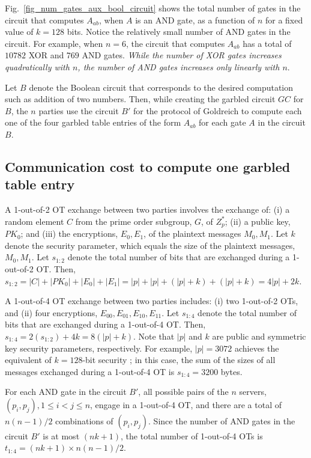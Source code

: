 \documentclass[10pt,journal,cspaper,compsoc]{IEEEtran}
\begin{document}
Fig.~\ref{fig_num_gates_aux_bool_circuit} shows the total number of gates in the circuit that computes $A_{ab}$, when $A$ is an AND gate, as a function of $n$ for a fixed value of $k=128$ bits. Notice the relatively small number of AND gates in the circuit. For example, when $n=6$, the circuit that computes $A_{ab}$ has a total of $10782$ XOR and $769$ AND gates. {\em While the number of XOR gates increases quadratically with $n$, the number of AND gates increases only linearly with $n$}.


Let $B$ denote the Boolean circuit that corresponds to the desired computation such as addition of two numbers. Then, while creating the garbled circuit $GC$ for $B$, the $n$ parties use the circuit $B'$ for the protocol of Goldreich to compute each one of the four garbled table entries of the form $A_{ab}$ for each gate $A$ in the circuit $B$.







\subsection{Communication cost to compute one garbled table entry}
\label{sec_communication_cost_to_compute_one_entry}

A 1-out-of-2 OT exchange between two parties involves the exchange of: (i) a random element $C$ from the prime order subgroup, $G$, of $Z_p^*$; (ii) a public key, $PK_0$; and (iii) the encryptions, $E_0,E_1$, of the plaintext messages $M_0,M_1$. Let $k$ denote the security parameter, which equals the size of the plaintext messages, $M_0,M_1$. Let $s_{1:2}$ denote the total number of bits that are exchanged during a 1-out-of-2 OT. Then, $s_{1:2}=|C|+|PK_0|+|E_0|+|E_1|=|p|+|p|+(|p|+k)+(|p|+k)=4|p|+2k$.


A 1-out-of-4 OT exchange between two parties includes: (i) two 1-out-of-2 OTs, and (ii) four encryptions, $E_{00},E_{01},E_{10},E_{11}$. Let $s_{1:4}$ denote the total number of bits that are exchanged during a 1-out-of-4 OT. Then, $s_{1:4}=2(s_{1:2})+4k=8(|p|+k)$. Note that $|p|$ and $k$ are public and symmetric key security parameters, respectively. For example, $|p|=3072$ achieves the equivalent of $k=128$-bit security \cite{nist_key_len_recommendations2012}; in this case, the sum of the sizes of all messages exchanged during a 1-out-of-4 OT is $s_{1:4}=3200$ bytes.


For each AND gate in the circuit $B'$, all possible pairs of the $n$ servers, $(p_i, p_j), 1\le i<j\le n$, engage in a 1-out-of-4 OT, and there are a total of $n(n-1)/2$ combinations of $(p_i,p_j)$. Since the number of AND gates in the circuit $B'$ is at most $(nk+1)$, the total number of 1-out-of-4 OTs is $t_{1:4}=(nk+1)\times n(n-1)/2$.
\end{document}
